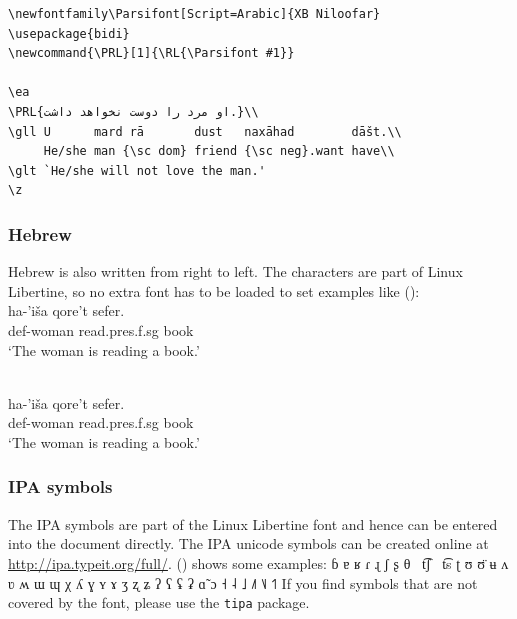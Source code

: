 \begin{verbatim}
\newfontfamily\Parsifont[Script=Arabic]{XB Niloofar}
\usepackage{bidi}
\newcommand{\PRL}[1]{\RL{\Parsifont #1}}

\ea
\PRL{او مرد را دوست نخواهد داشت.}\\
\gll U      mard rā       dust   naxāhad        dāšt.\\
     He/she man {\sc dom} friend {\sc neg}.want have\\
\glt `He/she will not love the man.'
\z
\end{verbatim}

\subsubsection{Hebrew}

Hebrew is also written from right to left. The characters are part of Linux Libertine, so no extra
font has to be loaded to set examples like ():
\ea
{}\\
\gll   ha-'iša          qore't                            sefer.\\
       {\sc def}-woman  read.{\sc pres}.{\sc f}.{\sc sg}  book\\
\glt `The woman is reading a book.'
\z
\begin{fitverb}
\ea
{}\\
\gll   ha-'iša          qore't                            sefer.\\
       {\sc def}-woman  read.{\sc pres}.{\sc f}.{\sc sg}  book\\
\glt `The woman is reading a book.'
\z
\end{fitverb}

\subsubsection{IPA symbols}

The IPA symbols are part of the Linux Libertine font and hence can be entered into the document
directly. The IPA unicode symbols can be created online at
\url{http://ipa.typeit.org/full/}. () shows some examples:
\ea
ɓ ɐ ʁ ɾ ɻ ʃ ʂ θ~  t͡ʃ~  t͡s  ʈ ʊ ʊ̈ ʉ ʌ ʋ ʍ ɯ ɰ χ ʎ ɣ ʏ ɤ ʒ ʐ ʑ ʔ ʕ ʢ ʡ ɑ̃ ɔ ˧ ˨ ˩ ˩˥ ˥˩ ˦˥
\z
If you find symbols that are not covered by the font, please use the \texttt{tipa} package.


